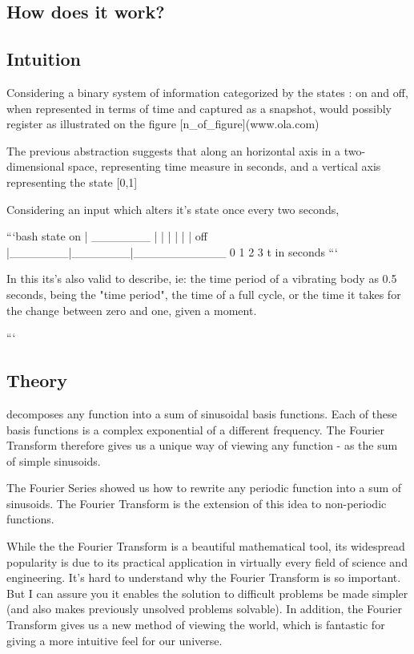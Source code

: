 \documentclass[ams,fleqn,amsmath,amssymb]{article}
\begin{document}
\begin{}
  
  \section{How does it work?}
  
\subsection{Intuition}
Considering a binary system of information categorized by the states : on and off, when represented in terms of time and captured as a snapshot, would possibly register as illustrated on the figure [n_of_figure](www.ola.com)

The previous abstraction suggests that along an horizontal axis in a two-dimensional space, representing time measure in seconds, and a vertical axis representing the state [0,1]

Considering an input which alters it's state once every two seconds, 

```bash
state
on  |        _______
|       |       |
|       |       |
        off |_______|_______|___________ 
        0       1       2       3      t in seconds
        ```
        
        In this its's also valid to describe, ie: the time period of a vibrating body as 0.5 seconds,
        being the "time period", the time of a full cycle, or the time it takes for the change between zero and one, given a moment.

        ```

\subsection*{Theory}
decomposes any function into a sum of sinusoidal basis functions. Each of these basis functions is a complex exponential of a different frequency. The Fourier Transform therefore gives us a unique way of viewing any function - as the sum of simple sinusoids.

The Fourier Series showed us how to rewrite any periodic function into a sum of sinusoids. The Fourier Transform is the extension of this idea to non-periodic functions.

While the the Fourier Transform is a beautiful mathematical tool, its widespread popularity is due to its practical application in virtually every field of science and engineering. It's hard to understand why the Fourier Transform is so important. But I can assure you it enables the solution to difficult problems be made simpler (and also makes previously unsolved problems solvable). In addition, the Fourier Transform gives us a new method of viewing the world, which is fantastic for giving a more intuitive feel for our universe.


\end{}
\end{document}
